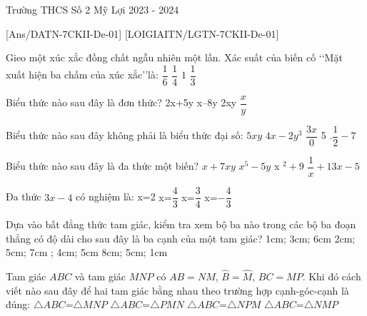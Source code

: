 \begin{name}{Trường THCS Số 2 Mỹ Lợi }{2023 - 2024}
\end{name}
[Ans/DATN-7CKII-De-01]
{}
{}[LOIGIAITN/LGTN-7CKII-De-01]
\begin{ex}
	Gieo một xúc xắc đồng chất ngẫu nhiên một lần. Xác suất của biến cố \lq\lq Mặt xuất hiện ba chấm của xúc xắc\rq\rq là:
	\choice
	{\True $\dfrac{1}{6}$}
	{$\dfrac{1}{4}$}
	{$1$}
	{$\dfrac{1}{3}$}
	\loigiai{}
\end{ex}
\begin{ex}
	Biểu thức nào sau đây là đơn thức?
	\choice
	{2x+5y}
	{x--8y}
	{\True 2xy}
	{$\dfrac{x}{y}$}
	\loigiai{}
\end{ex}
\begin{ex}
	Biểu thức nào sau đây không phải là biểu thức đại số:
	\choice
	{$5xy$}
	{$4x-2y ^3$}
	{\True $\dfrac{3x}0$}
	{5 $.\dfrac{1}{2}-7$}
	\loigiai{}
\end{ex}
\begin{ex}
	Biểu thức nào sau đây là đa thức một biến?
	\choice
	{$x+7xy$}
	{$x^5-5y$}
	{\True x $^2+9$}
	{$\dfrac{1}{x}+13x-5$}
	\loigiai{}
\end{ex}
\begin{ex}
	Đa thức $3x-4$ có nghiệm là:
	\choice
	{x=2}
	{\True x=$\dfrac{4}{3}$}
	{x=$\dfrac{3}{4}$}
	{x=$-\dfrac{4}{3}$}
	\loigiai{}
\end{ex}
\begin{ex}
	Dựa vào bất đẳng thức tam giác, kiểm tra xem bộ ba nào trong các bộ ba đoạn thẳng có độ dài cho sau đây là ba cạnh của một tam giác?
	\choice
	{1cm; 3cm; 6cm}
	{2cm; 5cm; 7cm}
	{\True 2cm; 4cm; 5cm}
	{8cm; 5cm; 1cm}
	\loigiai{}
\end{ex}
\begin{ex}
	Tam giác $ABC$ và tam giác $MNP$ có $AB=NM$, $\widehat{B}=\widehat{M}$, $BC=MP$. Khi đó cách viết nào sau đây để hai tam giác bằng nhau theo trường hợp cạnh-góc-cạnh là đúng:
	\choice
	{$\triangle ABC$=$\triangle MNP$}
	{$\triangle ABC$=$\triangle PMN$}
	{$\triangle ABC$=$\triangle NPM$}
	{\True $\triangle ABC$=$\triangle NMP$}
	\loigiai{}
\end{ex}
